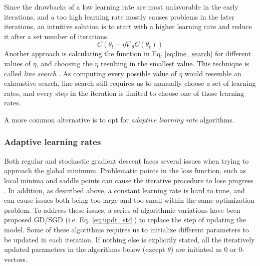 Since the drawbacks of a low learning rate are most unfavorable in the early iterations, and a too high learning rate mostly causes problems in the later iterations, an intuitive solution is to start with a higher learning rate and reduce it after a set number of iterations.
\begin{equation}\label{eq:line_search}
    C(\theta_t - \eta \nabla_\theta C(\theta_t))
\end{equation}
Another approach is calculating the function in Eq. \ref{eq:line_search} for different values of $\eta$, and choosing the $\eta$ resulting in the smallest value. This technique is called \textit{line search} \citep[p. 84]{Goodfellow-et-al-2016}.
As computing every possible value of $\eta$ would resemble an exhaustive search, line search still requires us to manually choose a set of learning rates, and every step in the iteration is limited to choose one of those learning rates.

A more common alternative is to opt for \textit{adaptive learning rate} algorithms.

\subsubsection{Adaptive learning rates}
Both regular and stochastic gradient descent faces several issues when trying to approach the global minimum.
Problematic points in the loss function, such as local minima and saddle points can cause the iterative procedure to lose progress \citep[p. 116-117]{Ketkar2017}.
In addition, as described above, a constant learning rate is hard to tune, and can cause issues both being too large and too small within the same optimization problem.
To address these issues, a series of algorithmic variations have been proposed GD/SGD (i.e. Eq. \ref{eq:updt_std}) to replace the step of updating the model.
Some of these algorithms requires us to initialize different parameters to be updated in each iteration.
If nothing else is explicitly stated, all the iteratively updated parameters in the algorithms below (except $\theta$) are initiated as 0 or 0-vectors.

